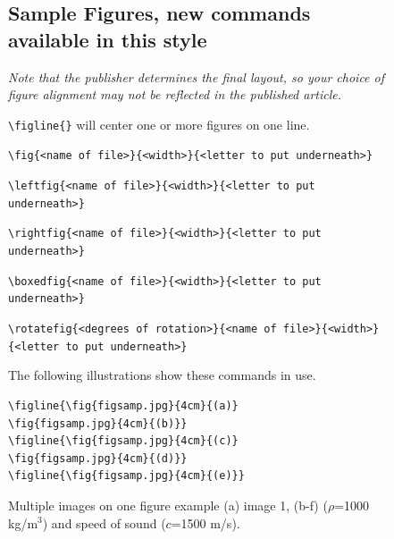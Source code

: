 \documentclass[reprint,NumberedRefs]{JASAnew}
\begin{document}
 
\begin{figure}[p]
\parskip=6pt
\baselineskip=12pt



\subsection{Sample Figures, new commands available in this style}
\vglue-14pt
{\it Note that the publisher determines the final layout, so 
your choice of figure alignment may not be reflected in the published
article.}

\noindent
\verb+\figline{}+ will center one or more figures on one line. 


\noindent
\verb+\fig{<name of file>}{<width>}{<letter to put underneath>}+

\noindent
\verb+\leftfig{<name of file>}{<width>}{<letter to put underneath>}+

\noindent
\verb+\rightfig{<name of file>}{<width>}{<letter to put underneath>}+

\noindent
\verb+\boxedfig{<name of file>}{<width>}{<letter to put underneath>}+

\noindent
\verb+\rotatefig{<degrees of rotation>}{<name of file>}{<width>}+\\
\verb+{<letter to put underneath>}+

The following illustrations show these commands in use.


\begin{verbatim}
\figline{\fig{figsamp.jpg}{4cm}{(a)}
\fig{figsamp.jpg}{4cm}{(b)}}
\figline{\fig{figsamp.jpg}{4cm}{(c)}
\fig{figsamp.jpg}{4cm}{(d)}}
\figline{\fig{figsamp.jpg}{4cm}{(e)}}
\end{verbatim}


\caption{ \label{fig:pressure_field} Multiple images on one figure example (a) image 1, (b-f) ($\rho$=1000 kg/m$^3$) and speed of sound ($c$=1500 m/s).}

\end{figure}
\end{document}
